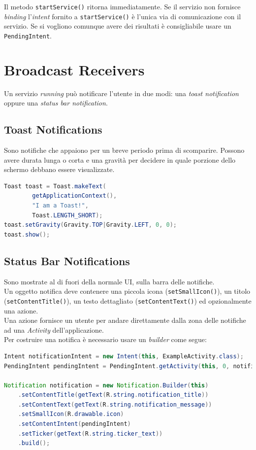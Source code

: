 \documentclass{book}
\begin{document}
Il metodo \texttt{startService()} ritorna immediatamente. Se il servizio non fornisce \textit{binding} l'\textit{intent} fornito a \texttt{startService()} è l'unica via di comunicazione con il servizio. Se si vogliono comunque avere dei risultati è consigliabile usare un \texttt{PendingIntent}.





\chapter{Broadcast Receivers}

Un servizio \textit{running} può notificare l'utente in due modi: una \textit{toast notification} oppure una \textit{status bar notification}.

\section{Toast Notifications}
Sono notifiche che appaiono per un breve periodo prima di scomparire. Possono avere durata lunga o corta e una gravità per decidere in quale porzione dello schermo debbano essere visualizzate.

\begin{lstlisting}[language=Java]
Toast toast = Toast.makeText(
		getApplicationContext(),
		"I am a Toast!",
		Toast.LENGTH_SHORT);
toast.setGravity(Gravity.TOP|Gravity.LEFT, 0, 0);
toast.show();
\end{lstlisting}


\section{Status Bar Notifications}
Sono mostrate al di fuori della normale UI, sulla barra delle notifiche.\\
Un oggetto notifica deve contenere una piccola icona (\texttt{setSmallIcon()}), un titolo (\texttt{setContentTitle()}), un testo dettagliato (\texttt{setContentText()}) ed opzionalmente una azione.\\
Una azione fornisce un utente per andare direttamente dalla zona delle notifiche ad una \textit{Activity} dell'applicazione.\\
Per costruire una notifica è necessario usare un \textit{builder} come segue:
\begin{lstlisting}[language=Java]
Intent notificationIntent = new Intent(this, ExampleActivity.class);
PendingIntent pendingIntent = PendingIntent.getActivity(this, 0, notificationIntent, 0);

Notification notification = new Notification.Builder(this)
    .setContentTitle(getText(R.string.notification_title))
    .setContentText(getText(R.string.notification_message))
    .setSmallIcon(R.drawable.icon)
    .setContentIntent(pendingIntent)
    .setTicker(getText(R.string.ticker_text))
    .build();

\end{lstlisting}
\end{document}
